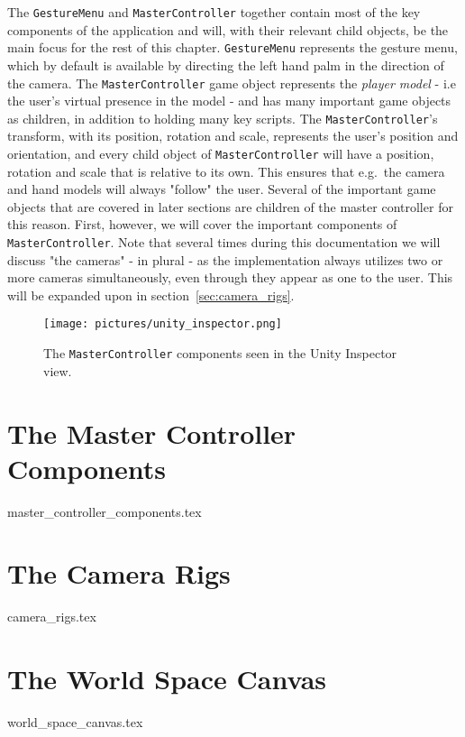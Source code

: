The \texttt{GestureMenu} and \texttt{MasterController} together contain most of the key components of the application and will, with their relevant child objects,
be the main focus for the rest of this chapter. \texttt{GestureMenu} represents the gesture menu, which by default is available by directing the left hand palm in the 
direction of the camera. The \texttt{MasterController} game object represents the \textit{player model} - i.e the user's virtual presence in the model - 
and has many important game objects as children, in addition to holding many key scripts. 
The \texttt{MasterController}'s transform, with its position, rotation and scale, represents the user's position and orientation, 
and every child object of \texttt{MasterController} will have a position, rotation and scale that is relative to its own. This ensures
that e.g.~the camera and hand models will always "follow" the user. Several of the important game objects that are covered in later sections are children of 
the master controller for this reason. First, however, we will cover the important components of \texttt{MasterController}.
Note that several times during this documentation we will discuss "the cameras" - in plural - as the implementation always utilizes two or more cameras simultaneously, 
even through they appear as one to the user. This will be expanded upon in section~\vref{sec:camera_rigs}.

\begin{figure}%
	\texttt{[image: pictures/unity\_inspector.png]} %
	\caption[The \texttt{MasterController} components]{The \texttt{MasterController} components seen in the Unity Inspector view.}
	\label{fig:unity_inspector}
\end{figure} 

\section{The Master Controller Components}
{master_controller_components.tex}


\section{The Camera Rigs}
\label{sec:camera_rigs}
{camera_rigs.tex}


\section{The World Space Canvas}
\label{sec:world_space_canvas}
{world_space_canvas.tex}


